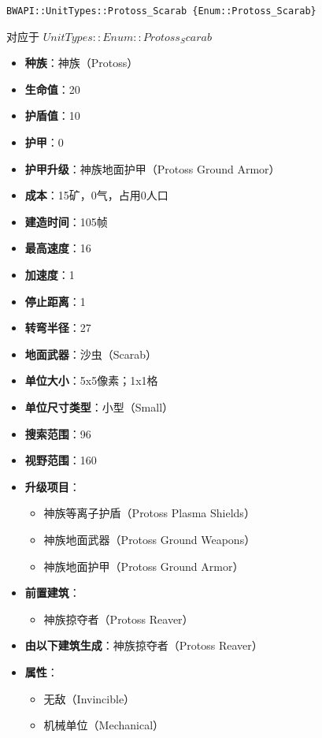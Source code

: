 \begin{tcolorbox}[colback=white, colframe=black!60!white, title=Protoss\_Scarab(), arc=0mm]
    \begin{verbatim}
BWAPI::UnitTypes::Protoss_Scarab {Enum::Protoss_Scarab}
    \end{verbatim}
    对应于  $ UnitTypes::Enum::Protoss_Scarab $ 
    \begin{itemize}
        \item \textbf{种族}：神族（Protoss）
        \item \textbf{生命值}：20
        \item \textbf{护盾值}：10
        \item \textbf{护甲}：0
        \item \textbf{护甲升级}：神族地面护甲（Protoss Ground Armor）
        \item \textbf{成本}：15矿，0气，占用0人口
        \item \textbf{建造时间}：105帧
        \item \textbf{最高速度}：16
        \item \textbf{加速度}：1
        \item \textbf{停止距离}：1
        \item \textbf{转弯半径}：27
        \item \textbf{地面武器}：沙虫（Scarab）
        \item \textbf{单位大小}：5x5像素；1x1格
        \item \textbf{单位尺寸类型}：小型（Small）
        \item \textbf{搜索范围}：96
        \item \textbf{视野范围}：160
        \item \textbf{升级项目}：
            \begin{itemize}
                \item 神族等离子护盾（Protoss Plasma Shields）
                \item 神族地面武器（Protoss Ground Weapons）
                \item 神族地面护甲（Protoss Ground Armor）
            \end{itemize}
        \item \textbf{前置建筑}：
            \begin{itemize}
                \item 神族掠夺者（Protoss Reaver）
            \end{itemize}
        \item \textbf{由以下建筑生成}：神族掠夺者（Protoss Reaver）
        \item \textbf{属性}：
            \begin{itemize}
                \item 无敌（Invincible）
                \item 机械单位（Mechanical）
            \end{itemize}
    \end{itemize}
\end{tcolorbox}

